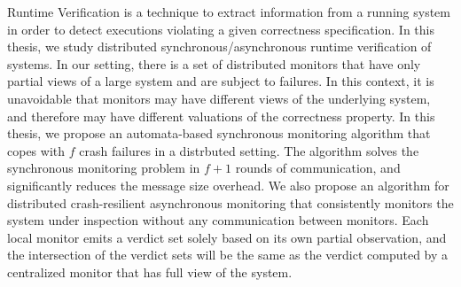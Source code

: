 


Runtime Verification is a technique to extract information from a running 
system in order to detect executions violating a given correctness 
specification. In this thesis, we study distributed synchronous/asynchronous 
runtime verification of systems. In our setting, there is a set of distributed 
monitors that have only partial views of a large system and are subject to 
failures. In this context, it is unavoidable that monitors may have different 
views of the underlying system, and therefore may have different valuations of 
the correctness property. In this thesis, we propose an automata-based 
synchronous monitoring algorithm that copes with $f$ crash failures in a 
distrbuted setting. The algorithm solves the synchronous monitoring problem in 
$f+1$ rounds of communication, and significantly reduces the message size 
overhead. We also propose an algorithm for distributed crash-resilient 
asynchronous monitoring that consistently monitors the system under inspection 
without any communication between monitors. Each local monitor emits a verdict 
set solely based on its own partial observation, and the intersection of the 
verdict sets will be the same as the verdict computed by a centralized monitor 
that has full view of the system.     











